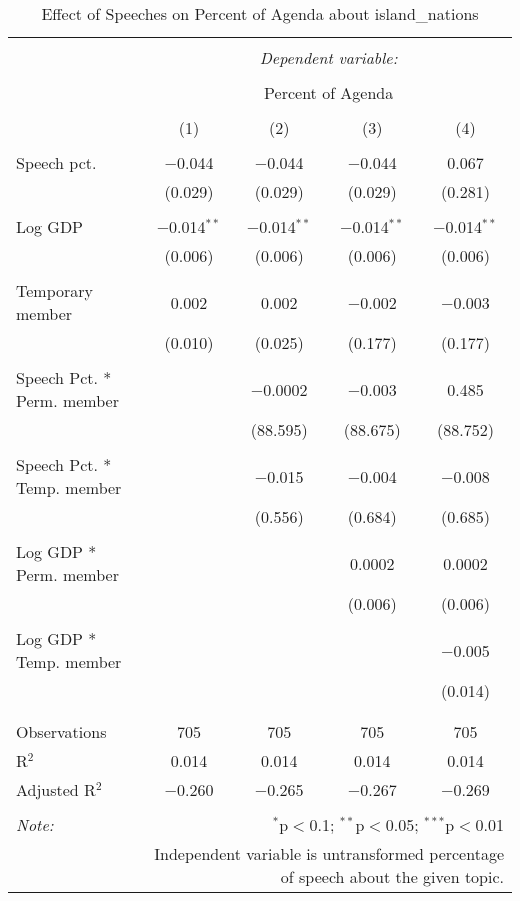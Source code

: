 
\begin{table}[!htbp] \centering 
  \caption{Effect of Speeches on Percent of Agenda about  island_nations} 
  \label{} 
\begin{tabular}{@{\extracolsep{5pt}}lcccc} 
\\[-1.8ex]\hline 
\hline \\[-1.8ex] 
 & \multicolumn{4}{c}{\textit{Dependent variable:}} \\ 
\cline{2-5} 
\\[-1.8ex] & \multicolumn{4}{c}{Percent of Agenda} \\ 
\\[-1.8ex] & (1) & (2) & (3) & (4)\\ 
\hline \\[-1.8ex] 
 Speech pct. & $-$0.044 & $-$0.044 & $-$0.044 & 0.067 \\ 
  & (0.029) & (0.029) & (0.029) & (0.281) \\ 
  & & & & \\ 
 Log GDP & $-$0.014$^{**}$ & $-$0.014$^{**}$ & $-$0.014$^{**}$ & $-$0.014$^{**}$ \\ 
  & (0.006) & (0.006) & (0.006) & (0.006) \\ 
  & & & & \\ 
 Temporary member & 0.002 & 0.002 & $-$0.002 & $-$0.003 \\ 
  & (0.010) & (0.025) & (0.177) & (0.177) \\ 
  & & & & \\ 
 Speech Pct. * Perm. member &  & $-$0.0002 & $-$0.003 & 0.485 \\ 
  &  & (88.595) & (88.675) & (88.752) \\ 
  & & & & \\ 
 Speech Pct. * Temp. member &  & $-$0.015 & $-$0.004 & $-$0.008 \\ 
  &  & (0.556) & (0.684) & (0.685) \\ 
  & & & & \\ 
 Log GDP * Perm. member &  &  & 0.0002 & 0.0002 \\ 
  &  &  & (0.006) & (0.006) \\ 
  & & & & \\ 
 Log GDP * Temp. member &  &  &  & $-$0.005 \\ 
  &  &  &  & (0.014) \\ 
  & & & & \\ 
\hline \\[-1.8ex] 
Observations & 705 & 705 & 705 & 705 \\ 
R$^{2}$ & 0.014 & 0.014 & 0.014 & 0.014 \\ 
Adjusted R$^{2}$ & $-$0.260 & $-$0.265 & $-$0.267 & $-$0.269 \\ 
\hline 
\hline \\[-1.8ex] 
\textit{Note:}  & \multicolumn{4}{r}{$^{*}$p$<$0.1; $^{**}$p$<$0.05; $^{***}$p$<$0.01} \\ 
 & \multicolumn{4}{r}{Independent variable is untransformed percentage of speech about the given topic.} \\ 
\end{tabular} 
\end{table} 
